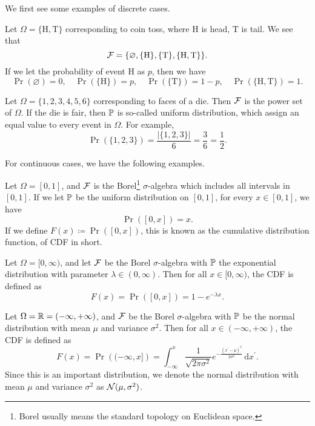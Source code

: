 We first see some examples of discrete cases.
\begin{eg}
	Let \(\Omega = \{\mathrm{H}, \mathrm{T}\}\) corresponding to coin toss, where \(\mathrm{H}\) is head, \(\mathrm{T}\) is tail. We see that
	\[
		\mathcal{\MakeUppercase{f}} = \{\varnothing , \{\mathrm{H} \}, \{\mathrm{T} \}, \{\mathrm{H} , \mathrm{T} \}\}.
	\]
	If we let the probability of event \(\mathrm{H} \) as \(p\), then we have
	\[
		\Pr(\varnothing ) = 0,\quad \Pr(\{\mathrm{H}\}) = p,\quad \Pr(\{\mathrm{T} \}) = 1 - p,\quad \Pr(\{\mathrm{H} , \mathrm{T} \}) = 1.
	\]
\end{eg}

\begin{eg}
	Let \(\Omega = \{1, 2, 3, 4, 5, 6\}\) corresponding to faces of a die. Then \(\mathcal{\MakeUppercase{f}} \) is the power set of \(\Omega \). If the die is fair, then
	\(\mathbb{\MakeUppercase{p}} \) is so-called uniform distribution, which assign an equal value to every event in \(\Omega \). For example,
	\[
		\Pr(\{1, 2, 3\}) = \frac{\left\vert \{1, 2, 3\} \right\vert }{6} = \frac{3}{6} = \frac{1}{2}.
	\]
\end{eg}

For continuous cases, we have the following examples.
\begin{eg}
	Let \(\Omega = [0, 1]\), and \(\mathcal{\MakeUppercase{f}}\) is the Borel\footnote{Borel usually means the standard topology on Euclidean space.} \(\sigma \)-algebra which includes all intervals in \([0, 1]\).
	If we let \(\mathbb{\MakeUppercase{p}} \) be the uniform distribution on \([0, 1]\), for every \(x\in [0, 1]\), we have
	\[
		\Pr([0, x]) = x.
	\]
	If we define \(F(x)\coloneqq \Pr([0, x]) \), this is known as the cumulative distribution function, of CDF in short.
\end{eg}

\begin{eg}
	Let \(\Omega = [0, \infty )\), and let \(\mathcal{\MakeUppercase{f}} \) be the Borel \(\sigma \)-algebra with \(\mathbb{\MakeUppercase{p}} \) the
	exponential distribution with parameter \(\lambda \in (0, \infty )\). Then for all \(x\in [0, \infty )\), the CDF is defined as
	\[
		F(x) = \Pr([0, x]) = 1 - e^{-\lambda x}.
	\]
\end{eg}

\begin{eg}
	Let \(\Omega = \mathbb{\MakeUppercase{r}} = (-\infty , +\infty )\), and \(\mathcal{\MakeUppercase{f}}\) be the Borel \(\sigma\)-algebra with \(\mathbb{\MakeUppercase{p}}\)
	be the normal distribution with mean \(\mu \) and variance \(\sigma ^{2} \). Then for all \(x\in (-\infty , +\infty )\), the CDF is defined as
	\[
		F(x) = \Pr\left( (-\infty , x] \right)  = \int_{-\infty}^{x} \frac{1}{\sqrt{2\pi \sigma ^{2} } } e^{- \frac{(x^\prime  - \mu )^{2} }{2 \sigma ^{2} }} \,\mathrm{d}x^\prime.
	\]
	Since this is an important distribution, we denote the normal distribution with mean \(\mu\) and variance \(\sigma ^{2} \) as \(\mathcal{\MakeUppercase{n}} (\mu , \sigma ^{2} )\).
\end{eg}

